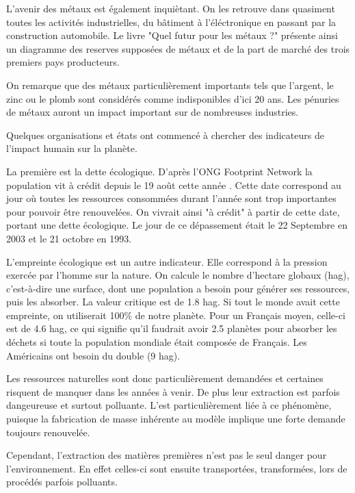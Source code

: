 L'avenir des métaux est également inquiètant. On les retrouve dans quasiment toutes les activités industrielles, du bâtiment à l'éléctronique en passant par la construction automobile. Le livre "Quel futur pour les métaux ?" \cite{LivreFuturMetaux} présente ainsi un diagramme des reserves supposées de métaux et de la part de marché des trois premiers pays producteurs.



On remarque que des métaux particulièrement importants tels que l'argent, le zinc ou le plomb sont considérés comme indisponibles d'ici 20 ans. Les pénuries de métaux auront un impact important sur de nombreuses industries.

\medbreak Quelques organisations et états ont commencé à chercher des indicateurs de l'impact humain sur la planète.

La première est la dette écologique. D'après l'ONG Footprint Network la population vit à crédit depuis le 19 août cette année \cite{DateACredit}. Cette date correspond au jour où toutes les ressources consommées durant l'année sont trop importantes pour pouvoir être renouvelées. On vivrait ainsi "à crédit" à partir de cette date, portant une dette écologique. Le jour de ce dépassement était le 22 Septembre en 2003 et le 21 octobre en 1993.

L'empreinte écologique est un autre indicateur. Elle correspond à la pression exercée par l'homme sur la nature. On calcule le nombre d'hectare globaux (hag), c'est-à-dire une surface, dont une population a besoin pour générer ses ressources, puis les absorber. La valeur critique est de 1.8 hag. Si tout le monde avait cette empreinte, on utiliserait 100\% de notre planète. Pour un Français moyen, celle-ci est de 4.6 hag, ce qui signifie qu'il faudrait avoir 2.5 planètes pour absorber les déchets si toute la population mondiale était composée de Français. Les Américains ont besoin du double (9 hag).

\medbreak Les ressources naturelles sont donc particulièrement demandées et certaines risquent de manquer dans les années à venir. De plus leur extraction est parfois dangeureuse et surtout polluante. L'\op est particulièrement liée à ce phénomène, puisque la fabrication de masse inhérente au modèle implique une forte demande toujours renouvelée. 

Cependant, l'extraction des matières premières n'est pas le seul danger pour l'environnement. En effet celles-ci sont ensuite transportées, transformées, lors de procédés parfois polluants.






